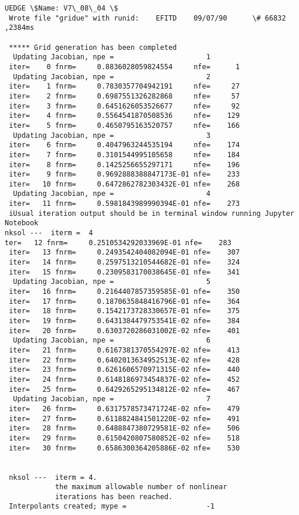 \documentclass[11pt]{article}
\begin{document}
    \begin{Verbatim}[commandchars=\\\{\}]
 UEDGE \$Name: V7\_08\_04 \$                                                               
 Wrote file "gridue" with runid:    EFITD    09/07/90      \# 66832 ,2384ms

 ***** Grid generation has been completed
  Updating Jacobian, npe =                      1
 iter=    0 fnrm=     0.8836028059824554     nfe=      1
  Updating Jacobian, npe =                      2
 iter=    1 fnrm=     0.7830357704942191     nfe=     27
 iter=    2 fnrm=     0.6987551326282868     nfe=     57
 iter=    3 fnrm=     0.6451626053526677     nfe=     92
 iter=    4 fnrm=     0.5564541870508536     nfe=    129
 iter=    5 fnrm=     0.4650795163520757     nfe=    166
  Updating Jacobian, npe =                      3
 iter=    6 fnrm=     0.4047963244535194     nfe=    174
 iter=    7 fnrm=     0.3101544995105658     nfe=    184
 iter=    8 fnrm=     0.1425256655297171     nfe=    196
 iter=    9 fnrm=     0.9692888388847173E-01 nfe=    233
 iter=   10 fnrm=     0.6472862782303432E-01 nfe=    268
  Updating Jacobian, npe =                      4
 iter=   11 fnrm=     0.5981843989990394E-01 nfe=    273
 iUsual iteration output should be in terminal window running Jupyter Notebook
nksol ---  iterm =  4
ter=   12 fnrm=     0.2510534292033969E-01 nfe=    283
 iter=   13 fnrm=     0.2493542404082094E-01 nfe=    307
 iter=   14 fnrm=     0.2597513210544682E-01 nfe=    324
 iter=   15 fnrm=     0.2309583170038645E-01 nfe=    341
  Updating Jacobian, npe =                      5
 iter=   16 fnrm=     0.2164407857359585E-01 nfe=    350
 iter=   17 fnrm=     0.1870635848416796E-01 nfe=    364
 iter=   18 fnrm=     0.1542173728330657E-01 nfe=    375
 iter=   19 fnrm=     0.6431384479753541E-02 nfe=    384
 iter=   20 fnrm=     0.6303720286031002E-02 nfe=    401
  Updating Jacobian, npe =                      6
 iter=   21 fnrm=     0.6167381370554297E-02 nfe=    413
 iter=   22 fnrm=     0.6402013634952513E-02 nfe=    428
 iter=   23 fnrm=     0.6261606570971315E-02 nfe=    440
 iter=   24 fnrm=     0.6148186973454837E-02 nfe=    452
 iter=   25 fnrm=     0.6429265295134812E-02 nfe=    467
  Updating Jacobian, npe =                      7
 iter=   26 fnrm=     0.6317578573471724E-02 nfe=    479
 iter=   27 fnrm=     0.6118824841501220E-02 nfe=    491
 iter=   28 fnrm=     0.6488847380729581E-02 nfe=    506
 iter=   29 fnrm=     0.6150420807580852E-02 nfe=    518
 iter=   30 fnrm=     0.6586300364205886E-02 nfe=    530


 nksol ---  iterm = 4.
            the maximum allowable number of nonlinear
            iterations has been reached.
 Interpolants created; mype =                   -1

    \end{Verbatim}
\end{document}
